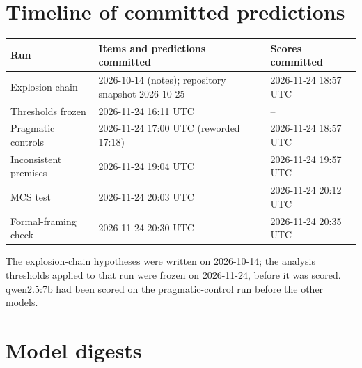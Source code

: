 \documentclass[11pt]{article}
\begin{document}



\appendix
\section{Timeline of committed predictions}\label{app:timeline}
\begin{center}\small
\begin{tabular}{lll}\toprule
Run & Items and predictions committed & Scores committed \\\midrule
Explosion chain & 2026-10-14 (notes); repository snapshot 2026-10-25 & 2026-11-24 18:57 UTC \\
Thresholds frozen & 2026-11-24 16:11 UTC & -- \\
Pragmatic controls & 2026-11-24 17:00 UTC (reworded 17:18) & 2026-11-24 18:57 UTC \\
Inconsistent premises & 2026-11-24 19:04 UTC & 2026-11-24 19:57 UTC \\
MCS test & 2026-11-24 20:03 UTC & 2026-11-24 20:12 UTC \\
Formal-framing check & 2026-11-24 20:30 UTC & 2026-11-24 20:35 UTC \\
\bottomrule\end{tabular}
\end{center}
The explosion-chain hypotheses were written on 2026-10-14; the analysis thresholds applied to that run
were frozen on 2026-11-24, before it was scored. qwen2.5:7b had been scored on the pragmatic-control run
before the other models.

\section{Model digests}\label{app:digests}

\end{document}
